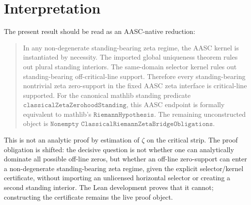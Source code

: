 \documentclass[11pt]{article}
\begin{document}
\section{Interpretation}

The present result should be read as an AASC-native reduction:
\begin{quote}
In any non-degenerate standing-bearing zeta regime, the AASC kernel is
instantiated by necessity.  The imported global uniqueness theorem rules out
plural standing interiors.  The same-domain selector kernel rules out
standing-bearing off-critical-line support.  Therefore every standing-bearing
nontrivial zeta zero-support in the fixed AASC zeta interface is critical-line
supported.  For the canonical mathlib standing predicate
\(\texttt{classicalZetaZerohoodStanding}\), this AASC endpoint is formally
equivalent to mathlib's \(\texttt{RiemannHypothesis}\).  The remaining
unconstructed object is
\(\texttt{Nonempty ClassicalRiemannZetaBridgeObligations}\).
\end{quote}

This is not an analytic proof by estimation of \(\zeta\) on the critical
strip.  The proof obligation is shifted: the decisive question is not whether
one can analytically dominate all possible off-line zeros, but whether an
off-line zero-support can enter a non-degenerate standing-bearing zeta regime,
given the explicit selector/kernel certificate, without importing an
unlicensed horizontal selector or creating a second standing interior.  The
Lean development proves that it cannot; constructing the certificate remains
the live proof object.
\end{document}
